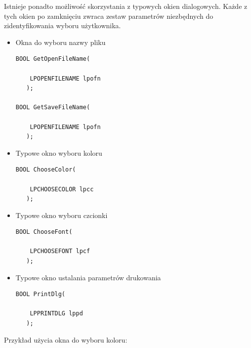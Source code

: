 Istnieje ponadto możliwość skorzystania z typowych okien dialogowych. Każde z tych
okien po zamknięciu zwraca zestaw parametrów niezbędnych do zidentyfikowania wyboru użytkownika.
\begin{itemize}

\item Okna do wyboru nazwy pliku
\begin{scriptsize}
\begin{verbatim}
BOOL GetOpenFileName(

    LPOPENFILENAME lpofn 	
   );

BOOL GetSaveFileName(

    LPOPENFILENAME lpofn 	
   );	
\end{verbatim}
\end{scriptsize}

\item Typowe okno wyboru koloru
\begin{scriptsize}
\begin{verbatim}
BOOL ChooseColor(

    LPCHOOSECOLOR lpcc 	
   );
\end{verbatim}
\end{scriptsize}

\item Typowe okno wyboru czcionki
\begin{scriptsize}
\begin{verbatim}
BOOL ChooseFont(

    LPCHOOSEFONT lpcf 	
   );
\end{verbatim}
\end{scriptsize}

\item Typowe okno ustalania parametrów drukowania
\begin{scriptsize}
\begin{verbatim}
BOOL PrintDlg(

    LPPRINTDLG lppd 	
   );	
\end{verbatim}
\end{scriptsize}

\end{itemize}

Przykład użycia okna do wyboru koloru:


